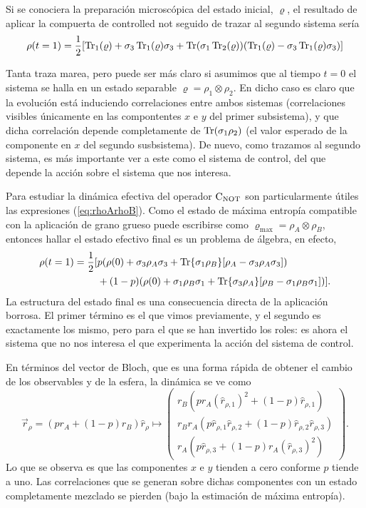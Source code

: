 Si se conociera la preparación microscópica del estado inicial, $\varrho$, el resultado de aplicar la compuerta de controlled not seguido de trazar al segundo sistema sería
\begin{equation*}
  \rho(t=1)=\frac{1}{2}\qty[\Tr_{1}(\varrho)+\sigma_{3}\Tr_{1}(\varrho)\sigma_{3}+\Tr(\sigma_{1}\Tr_{2}(\varrho))(\Tr_{1}(\varrho)-\sigma_{3}\Tr_{1}(\varrho)\sigma_{3})]
\end{equation*}

Tanta traza marea, pero puede ser más claro si asumimos que al tiempo $t=0$ el sistema se halla en un estado separable $\varrho=\rho_{1}\otimes\rho_{2}$. En dicho caso es claro que la evolución está induciendo correlaciones entre ambos sistemas (correlaciones visibles únicamente en las compontentes $x$ e $y$ del primer subsistema), y que dicha correlación depende completamente de $\Tr(\sigma_{1}\rho_{2})$ (el valor esperado de la componente en $x$ del segundo susbsistema). De nuevo, como trazamos al segundo sistema, es más importante ver a este como el sistema de control, del que depende la acción sobre el sistema que nos interesa.

Para estudiar la dinámica efectiva del operador $\text{C}_{\text{NOT}}$ son particularmente útiles las expresiones (\ref{eq:rhoArhoB}). Como el estado de máxima entropía compatible con la aplicación de grano grueso puede escribirse como $\varrho_{\max}=\rho_{A}\otimes\rho_{B}$, entonces hallar el estado efectivo final es un problema de álgebra, en efecto,
\begin{align*}
    \rho(t=1)=\frac{1}{2}[&p(\rho(0)+\sigma_{3}\rho_{A}\sigma_{3}+\Tr{\sigma_{1}\rho_{B}}[\rho_{A}-\sigma_{3}\rho_{A}\sigma_{3}])\\
    &+(1-p)(\rho(0)+\sigma_{1}\rho_{B}\sigma_{1}+\Tr{\sigma_{3}\rho_{A}}[\rho_{B}-\sigma_{1}\rho_{B}\sigma_{1}])].
\end{align*}
La estructura del estado final es una consecuencia directa de la aplicación borrosa. El primer término es el que vimos previamente, y el segundo es exactamente los mismo, pero para el que se han invertido los roles: es ahora el sistema que no nos interesa el que experimenta la acción del sistema de control.

En términos del vector de Bloch, que es una forma rápida de obtener el cambio de los observables y de la esfera, la dinámica se ve como
\begin{equation*}
    \vec{r}_{\rho}=(pr_{A}+(1-p)r_{B})\hat{r}_{\rho}\mapsto\begin{pmatrix}
        r_{B}(pr_{A}(\hat{r}_{\rho,1})^2+(1-p)\hat{r}_{\rho,1})\\
        r_{B}r_{A}(p\hat{r}_{\rho,1}\hat{r}_{\rho,2}+(1-p)\hat{r}_{\rho,2}\hat{r}_{\rho,3})\\
        r_{A}(p\hat{r}_{\rho,3}+(1-p)r_{A}(\hat{r}_{\rho,3})^{2})
    \end{pmatrix}.
  \end{equation*}
Lo que se observa es que las componentes $x$ e $y$ tienden a cero conforme $p$ tiende a uno. Las correlaciones que se generan sobre dichas componentes con un estado completamente mezclado se pierden (bajo la estimación de máxima entropía).

